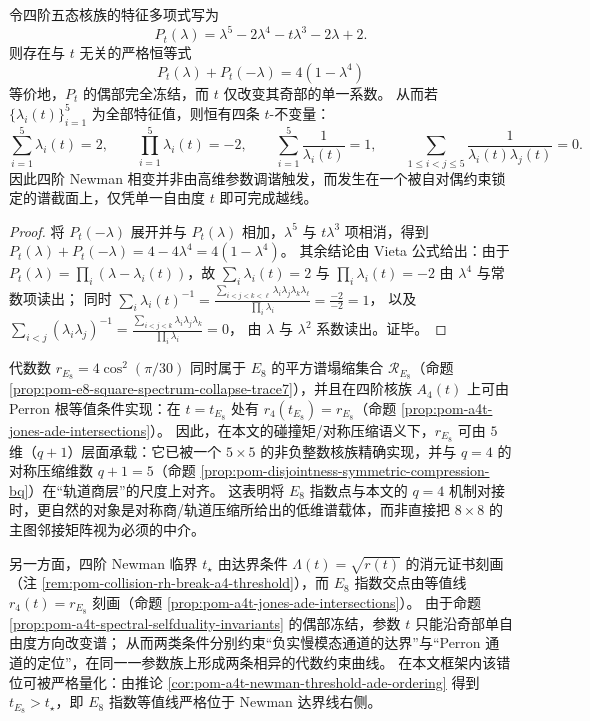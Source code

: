 \begin{proposition}\label{prop:pom-a4t-spectral-selfduality-invariants}
令四阶五态核族的特征多项式写为
\[
P_t(\lambda)=\lambda^5-2\lambda^4-t\lambda^3-2\lambda+2.
\]
则存在与 \(t\) 无关的严格恒等式
\[
\boxed{\;P_t(\lambda)+P_t(-\lambda)=4(1-\lambda^4)\;}
\]
等价地，\(P_t\) 的偶部完全冻结，而 \(t\) 仅改变其奇部的单一系数。
从而若 \(\{\lambda_i(t)\}_{i=1}^5\) 为全部特征值，则恒有四条 \(t\)-不变量：
\[
\sum_{i=1}^5 \lambda_i(t)=2,\qquad
\prod_{i=1}^5 \lambda_i(t)=-2,\qquad
\sum_{i=1}^5 \frac{1}{\lambda_i(t)}=1,\qquad
\sum_{1\le i<j\le 5}\frac{1}{\lambda_i(t)\lambda_j(t)}=0.
\]
因此四阶 Newman 相变并非由高维参数调谐触发，而发生在一个被自对偶约束锁定的谱截面上，仅凭单一自由度 \(t\) 即可完成越线。
\end{proposition}
\begin{proof}
将 \(P_t(-\lambda)\) 展开并与 \(P_t(\lambda)\) 相加，\(\lambda^5\) 与 \(t\lambda^3\) 项相消，得到
\(
P_t(\lambda)+P_t(-\lambda)=4-4\lambda^4=4(1-\lambda^4)
\)。
其余结论由 Vieta 公式给出：由于 \(P_t(\lambda)=\prod_i(\lambda-\lambda_i(t))\)，故
\(\sum_i\lambda_i(t)=2\) 与 \(\prod_i\lambda_i(t)=-2\) 由 \(\lambda^4\) 与常数项读出；
同时
\(
\sum_i \lambda_i(t)^{-1}=\frac{\sum_{i<j<k<\ell}\lambda_i\lambda_j\lambda_k\lambda_\ell}{\prod_i\lambda_i}
=\frac{-2}{-2}=1
\)，
以及
\(
\sum_{i<j}(\lambda_i\lambda_j)^{-1}
=\frac{\sum_{i<j<k}\lambda_i\lambda_j\lambda_k}{\prod_i\lambda_i}
=0
\)，
由 \(\lambda\) 与 \(\lambda^2\) 系数读出。证毕。
\end{proof}

\begin{remark}\label{rem:pom-e8-five-state-bridge}
代数数 \(r_{E_8}=4\cos^2(\pi/30)\) 同时属于 \(E_8\) 的平方谱塌缩集合 \(\mathcal R_{E_8}\)（命题 \ref{prop:pom-e8-square-spectrum-collapse-trace7}），并且在四阶核族 \(A_4(t)\) 上可由 Perron 根等值条件实现：在 \(t=t_{E_8}\) 处有 \(r_4(t_{E_8})=r_{E_8}\)（命题 \ref{prop:pom-a4t-jones-ade-intersections}）。
因此，在本文的碰撞矩/对称压缩语义下，\(r_{E_8}\) 可由 \(5\) 维（\(q+1\)）层面承载：它已被一个 \(5\times 5\) 的非负整数核族精确实现，并与 \(q=4\) 的对称压缩维数 \(q+1=5\)（命题 \ref{prop:pom-disjointness-symmetric-compression-bq}）在“轨道商层”的尺度上对齐。
这表明将 \(E_8\) 指数点与本文的 \(q=4\) 机制对接时，更自然的对象是对称商/轨道压缩所给出的低维谱载体，而非直接把 \(8\times 8\) 的主图邻接矩阵视为必须的中介。
\par
另一方面，四阶 Newman 临界 \(t_\star\) 由达界条件 \(\Lambda(t)=\sqrt{r(t)}\) 的消元证书刻画（注 \ref{rem:pom-collision-rh-break-a4-threshold}），而 \(E_8\) 指数交点由等值线 \(r_4(t)=r_{E_8}\) 刻画（命题 \ref{prop:pom-a4t-jones-ade-intersections}）。
由于命题 \ref{prop:pom-a4t-spectral-selfduality-invariants} 的偶部冻结，参数 \(t\) 只能沿奇部单自由度方向改变谱；
从而两类条件分别约束“负实慢模态通道的达界”与“Perron 通道的定位”，在同一一参数族上形成两条相异的代数约束曲线。
在本文框架内该错位可被严格量化：由推论 \ref{cor:pom-a4t-newman-threshold-ade-ordering} 得到 \(t_{E_8}>t_\star\)，即 \(E_8\) 指数等值线严格位于 Newman 达界线右侧。
\end{remark}



